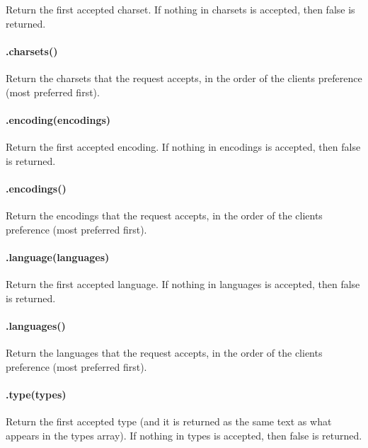 Return the first accepted charset. If nothing in {\ttfamily charsets} is accepted, then {\ttfamily false} is returned.

\paragraph*{.charsets()}

Return the charsets that the request accepts, in the order of the client\textquotesingle{}s preference (most preferred first).

\paragraph*{.encoding(encodings)}

Return the first accepted encoding. If nothing in {\ttfamily encodings} is accepted, then {\ttfamily false} is returned.

\paragraph*{.encodings()}

Return the encodings that the request accepts, in the order of the client\textquotesingle{}s preference (most preferred first).

\paragraph*{.language(languages)}

Return the first accepted language. If nothing in {\ttfamily languages} is accepted, then {\ttfamily false} is returned.

\paragraph*{.languages()}

Return the languages that the request accepts, in the order of the client\textquotesingle{}s preference (most preferred first).

\paragraph*{.type(types)}

Return the first accepted type (and it is returned as the same text as what appears in the {\ttfamily types} array). If nothing in {\ttfamily types} is accepted, then {\ttfamily false} is returned.

